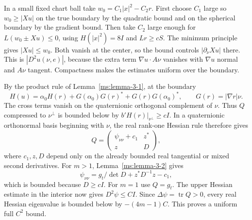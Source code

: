 In a small fixed chart ball take $w_0=C_1|x|^2-C_2r$. First choose $C_1$ large so $w_0\ge|Xu|$ on the true boundary by the quadratic bound and on the spherical boundary by the gradient bound. Then take $C_2$ large enough for $L(w_0\pm Xu)\le0$, using $H(|x|^2)=8I$ and $Lr\ge cS$. The minimum principle gives $|Xu|\le w_0$. Both vanish at the center, so the bound controls $|\partial_\nu Xu|$ there. This is $|D^2u(\nu,e)|$, because the extra term $\nabla u\cdot A\nu$ vanishes with $\nabla u$ normal and $A\nu$ tangent. Compactness makes the estimates uniform over the boundary.

By the product rule of Lemma~\ref{ms:lemma-3-1}, at the boundary
\[
 H(u)=\alpha_0H(r)+G(\alpha_0)G(r)^*+G(r)G(\alpha_0)^*,
 \qquad G(r)=|\nabla r|\nu .
\]
The cross terms vanish on the quaternionic orthogonal complement of $\nu$. Thus $Q$ compressed to $\nu^\perp$ is bounded below by $b'H(r)|_{\nu^\perp}\ge cI$. In a quaternionic orthonormal basis beginning with $\nu$, the real rank-one Hessian rule therefore gives
\[
 Q=\begin{pmatrix}\psi_{\nu\nu}+c_1&z^*\\z&D\end{pmatrix},
\]
where $c_1,z,D$ depend only on the already bounded real tangential or mixed second derivatives. For $m>1$, Lemma~\ref{ms:lemma-3-2} gives
\[
 \psi_{\nu\nu}=g_t/\det D+z^*D^{-1}z-c_1,
\]
which is bounded because $D\ge cI$. For $m=1$ use $Q=g_t$. The upper Hessian estimate in the interior now gives $D^2\psi\le CI$. Since $\Delta\psi=\operatorname{tr}Q>0$, every real Hessian eigenvalue is bounded below by $-(4m-1)C$. This proves a uniform full $C^2$ bound.
